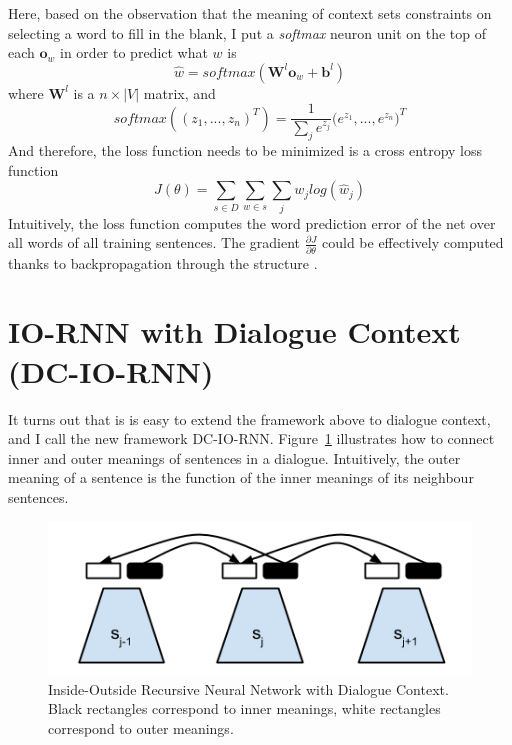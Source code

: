 \documentclass[10pt]{article}
\begin{document}
Here, based on the observation that the meaning of context sets constraints on 
selecting a word to fill in the blank, I put a \textit{softmax} neuron unit on the top 
of each $\mathbf{o}_w$ in order to predict what $w$ is
\begin{equation}
	\hat{w} = softmax(\mathbf{W}^l \mathbf{o}_w + \mathbf{b}^l)
\end{equation}
where $\mathbf{W}^l$ is a $n \times |V|$ matrix, and 
\begin{equation}
	softmax((z_1,...,z_n)^T) = \frac{1}{\sum_j e^{z_j}} \big( e^{z_1},..., e^{z_n} \big)^T
\end{equation}
And therefore, the loss function needs to be minimized is a cross entropy loss function 
\begin{equation}
	J(\theta) = \sum_{s \in D} \sum_{w \in s} \sum_j w_j log(\hat{w}_j)
\end{equation}
Intuitively, the loss function computes the word prediction error of the net over all 
words of all training sentences. 
The gradient $\frac{\partial J}{\partial \theta}$ could be effectively computed 
thanks to backpropagation through the structure \citep{goller_learning_1996}.


\section{IO-RNN with Dialogue Context (DC-IO-RNN)}
\label{section dciornn}
It turns out that is is easy to extend the framework above to dialogue context, and 
I call the new framework DC-IO-RNN.
Figure~\ref{figure dciornn} illustrates how to connect inner and outer meanings 
of sentences in a dialogue. Intuitively, the outer meaning of a sentence is 
the function of the inner meanings of its neighbour sentences. 

\begin{figure}[h!]
	\center
	\includegraphics[scale=0.5]{DC-IO-RNN.png}
	\caption{Inside-Outside Recursive Neural Network with Dialogue Context. 
	Black rectangles correspond to inner meanings, 
	white rectangles correspond to outer meanings.}
	\label{figure dciornn}
\end{figure}
\end{document}

